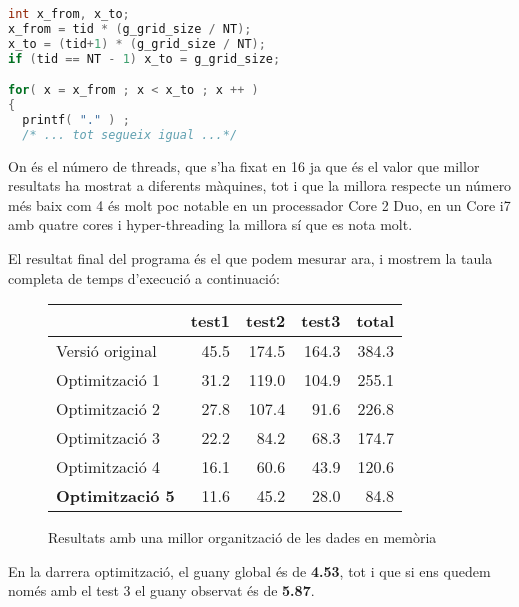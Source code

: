 \begin{lstlisting}[label=threads2, caption=Divisió de feina a cada thread, language=C]
int x_from, x_to;
x_from = tid * (g_grid_size / NT);
x_to = (tid+1) * (g_grid_size / NT);
if (tid == NT - 1) x_to = g_grid_size;

for( x = x_from ; x < x_to ; x ++ )
{
  printf( "." ) ;
  /* ... tot segueix igual ...*/
\end{lstlisting}

On  és el número de threads, que s'ha fixat en 16 ja que és el valor que millor resultats ha mostrat a diferents màquines, tot i que la millora respecte un número més baix com 4 és molt poc notable en un processador Core 2 Duo, en un Core i7 amb quatre cores i hyper-threading la millora sí que es nota molt.

El resultat final del programa és el que podem mesurar ara, i mostrem la taula completa de temps d'execució a continuació:

\begin{figure}[ht]
  \caption{Resultats amb una millor organització de les dades en memòria}\label{fig:elapsed_5}
  \begin{center}
    \begin{tabular}{ l r r r r }
      & test1 & test2 & test3 & total \\
      \hline
      Versió original & 45.5 & 174.5 & 164.3 & 384.3 \\
      Optimització 1 & 31.2 & 119.0 & 104.9 & 255.1 \\
      Optimització 2 & 27.8 & 107.4 & 91.6 & 226.8 \\
      Optimització 3 & 22.2 & 84.2 & 68.3 & 174.7 \\
      Optimització 4 & 16.1 & 60.6 & 43.9 & 120.6 \\
      \textbf{Optimització 5} & 11.6 & 45.2 & 28.0 & 84.8 \\
    \end{tabular}
  \end{center}
\end{figure}

En la darrera optimització, el guany global és de \textbf{4.53}, tot i que si ens quedem només amb el test 3 el guany observat és de \textbf{5.87}.
